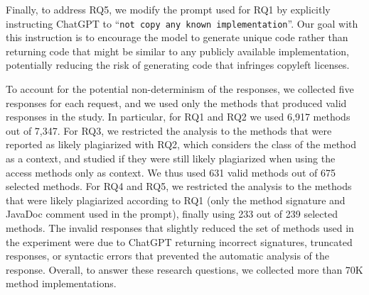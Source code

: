 Finally, to address RQ5, we modify the prompt used for RQ1 by explicitly instructing ChatGPT to  ``\texttt{not copy any known implementation}''. Our goal with this instruction is to encourage the model to generate unique code rather than returning code that might be similar to any publicly available implementation, potentially reducing the risk of generating code that infringes copyleft licenses.




To account for the potential non-determinism of the responses, we collected five responses for each request, and we used only the methods that produced valid responses in the study. In particular, for RQ1 and RQ2 we used 6,917 methods out of 7,347. For RQ3, we restricted the analysis to the methods that were reported as likely plagiarized with RQ2, which considers the class of the method as a context, and studied if they were still likely plagiarized when using the access methods only as context. We thus used 631 valid methods out of 675 selected methods. For RQ4 and RQ5, we restricted the analysis to the methods that were likely plagiarized according to RQ1 (only the method signature and JavaDoc comment used in the prompt), finally using 233 out of 239 selected methods. The invalid responses that slightly reduced the set of methods used in the experiment were due to ChatGPT returning incorrect signatures, truncated responses, or syntactic errors that prevented the automatic analysis of the response. Overall, to answer these research questions, we collected more than 70K method implementations.

\begin{comment}
\begin{itemize}
    \item \textbf{RQ1}: Out of 7,347 requests made, 6,917 methods were obtained for which it is possible to analyze the results.
    \item \textbf{RQ2}: Out of 7,347 requests made, 6,917 methods were obtained for which it is possible to analyze the results.
    \item \textbf{RQ3}: Out of 675 requests made, 631 methods were obtained for which it is possible to analyze the results.
    \item \textbf{RQ4}: Out of 7,347 requests made, 6,917 methods were obtained with temperature 0 for which it is possible to analyze the results; out of 239 requests made, 233 methods were obtained with temperature 2 for which it is possible to analyze the results.
    \item \textbf{RQ5}: Out of 239 requests made, 235 methods were obtained for which it is possible to analyze the results.
\end{itemize}
\end{comment}







